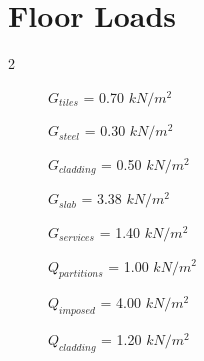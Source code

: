 \documentclass[
  letterpaper,
  DIV=11,
  numbers=noendperiod]{scrartcl}
\author{}
\date{}
\begin{document}
\Large 
\linespread{1.4}
\selectfont

\section{}\label{section}

\section{}\label{section-1}

\section{}\label{section-2}

\section{}\label{section-3}

\section{}\label{section-4}

\section{}\label{section-5}

\section{Floor Loads}\label{floor-loads}

\begin{multicols}{2}
\begin{description}
    \item[]$G_{tiles}$ = 0.70 $kN/m^2$
    \item[]$G_{steel}$ = 0.30 $kN/m^2$
    \item[]$G_{cladding}$ = 0.50 $kN/m^2$
    \item[]$G_{slab}$ = 3.38 $kN/m^2$
    \item[]$G_{services}$ = 1.40 $kN/m^2$
    \item[]$Q_{partitions}$ = 1.00 $kN/m^2$
    \item[]$Q_{imposed}$ = 4.00 $kN/m^2$
    \item[]$Q_{cladding}$ = 1.20 $kN/m^2$
\end{description}
\end{multicols}
\end{document}
